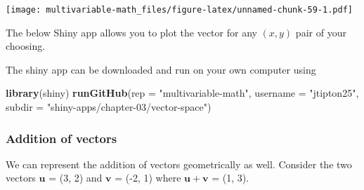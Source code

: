 \documentclass[
]{book}
\newenvironment{Shaded}{\begin{snugshade}}{\end{snugshade}}
\newcommand{\DataTypeTok}[1]{\textcolor[rgb]{0.13,0.29,0.53}{#1}}
\newcommand{\DecValTok}[1]{\textcolor[rgb]{0.00,0.00,0.81}{#1}}
\newcommand{\KeywordTok}[1]{\textcolor[rgb]{0.13,0.29,0.53}{\textbf{#1}}}
\newcommand{\NormalTok}[1]{#1}
\newcommand{\OperatorTok}[1]{\textcolor[rgb]{0.81,0.36,0.00}{\textbf{#1}}}
\newcommand{\StringTok}[1]{\textcolor[rgb]{0.31,0.60,0.02}{#1}}
\theoremstyle{definition}
\theoremstyle{definition}
\theoremstyle{definition}
\theoremstyle{definition}
\theoremstyle{remark}
\begin{document}
\texttt{[image: multivariable-math\_files/figure-latex/unnamed-chunk-59-1.pdf]}

The below Shiny app allows you to plot the vector for any \((x, y)\) pair of your choosing.

The shiny app can be downloaded and run on your own computer using

\begin{Shaded}
\begin{Highlighting}[]
\KeywordTok{library}\NormalTok{(shiny)}
\KeywordTok{runGitHub}\NormalTok{(}\DataTypeTok{rep =} \StringTok{"multivariable-math"}\NormalTok{, }
          \DataTypeTok{username =} \StringTok{"jtipton25"}\NormalTok{,}
          \DataTypeTok{subdir =} \StringTok{"shiny-apps/chapter-03/vector-space"}\NormalTok{) }
\end{Highlighting}
\end{Shaded}

\hypertarget{addition-of-vectors}{%
\subsubsection{Addition of vectors}\label{addition-of-vectors}}

We can represent the addition of vectors geometrically as well. Consider the two vectors \(\mathbf{u}\) = (3, 2) and \(\mathbf{v}\) = (-2, 1) where \(\mathbf{u} + \mathbf{v}\) = (1, 3).

\begin{Shaded}
\end{Shaded}
\end{document}
